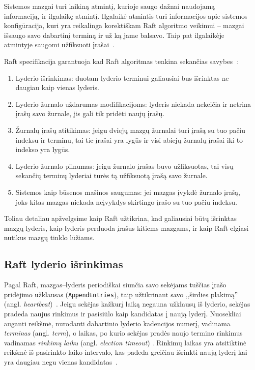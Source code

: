 \documentclass{VUMIFPSkursinis}
\begin{document}
Sistemos mazgai turi laikiną atmintį, kurioje saugo dažnai naudojamą informaciją, ir ilgalaikę atmintį. Ilgalaikė atmintis turi informacijos apie sistemos konfigūracija, kuri yra reikalinga korektiškam Raft algoritmo veikimui -- mazgai išsaugo savo dabartinį terminą ir už ką jame balsavo. Taip pat ilgalaikėje atmintyje saugomi užfiksuoti įrašai~\cite{ongaro_consensus}.

Raft specifikacija garantuoja kad Raft algoritmas tenkina sekančias savybes~\cite{ongaro_consensus}: 

\begin{enumerate}
\item Lyderio išrinkimas: duotam lyderio terminui galiausiai bus išrinktas ne daugiau kaip vienas lyderis.
\item Lyderio žurnalo uždarumas modifikacijoms: lyderis niekada nekeičia ir netrina įrašų savo žurnale, jis gali tik pridėti naujų įrašų.
\item Žurnalų įrašų atitikimas: jeigu dviejų mazgų žurnalai turi įrašą su tuo pačiu indeksu ir terminu, tai tie įrašai yra lygūs ir visi abiejų žurnalų įrašai iki to indekso yra lygūs.
\item Lyderio žurnalo pilnumas: jeigu žurnalo įrašas buvo užfiksuotas, tai visų sekančių terminų lyderiai turės tą užfiksuotą įrašą savo žurnale.
\item Sistemos kaip būsenos mašinos saugumas: jei mazgas įvykdė žurnalo įrašą, joks kitas mazgas niekada neįvykdys skirtingo įrašo su tuo pačiu indeksu.
\end{enumerate}

Toliau detaliau apžvelgsime kaip Raft užtikrina, kad galiausiai būtų išrinktas mazgų lyderis, kaip lyderis perduoda įrašus kitiems mazgams, ir kaip Raft elgiasi nutikus mazgų tinklo lūžiams.

\subsection{Raft lyderio išrinkimas}

Pagal Raft, mazgas--lyderis periodiškai siunčia savo sekėjams tuščias įrašo pridėjimo užklausas (\texttt{AppendEntries}), taip užtikrinant savo ,,širdies plakimą'' (angl. \textit{heartbeat})~\cite{ongaro_consensus}. Jeigu sekėjas kažkurį laiką negauna užklausų iš lyderio, sekėjas pradeda naujus rinkimus ir pasisiūlo kaip kandidatas į naują lyderį. Nuosekliai auganti reikšmė, nurodanti dabartinio lyderio kadencijos numerį, vadinama \textit{terminas} (angl. \emph{term}), o laikas, po kurio sekėjas pradės naujo termino rinkimus vadinamas \textit{rinkimų laiku} (angl. \textit{election timeout}) . Rinkimų laikas yra atsitiktinė reikšmė iš pasirinkto laiko intervalo, kas padeda greičiau išrinkti naują lyderį kai yra daugiau negu vienas kandidatas~\cite{ongaro_consensus}.
\end{document}
